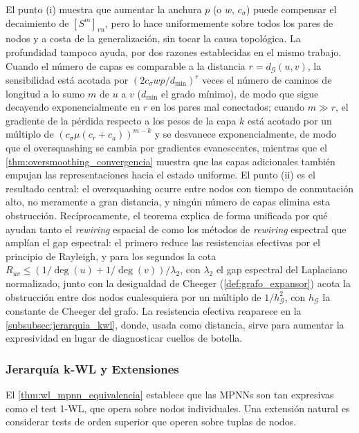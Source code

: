 El punto (i) muestra que aumentar la anchura $p$ (o $w$, $c_\sigma$) puede compensar el decaimiento de $[S^m]_{vu}$, pero lo hace uniformemente sobre todos los pares de nodos y a costa de la generalización, sin tocar la causa topológica. La profundidad tampoco ayuda, por dos razones establecidas en el mismo trabajo. Cuando el número de capas es comparable a la distancia $r = d_{\mathcal{G}}(u,v)$, la sensibilidad está acotada por $(2 c_\sigma w p / d_{\min})^{r}$ veces el número de caminos de longitud a lo sumo $m$ de $u$ a $v$ ($d_{\min}$ el grado mínimo), de modo que sigue decayendo exponencialmente en $r$ en los pares mal conectados; cuando $m \gg r$, el gradiente de la pérdida respecto a los pesos de la capa $k$ está acotado por un múltiplo de $(c_\sigma \mu (c_r + c_a))^{m-k}$ y se desvanece exponencialmente, de modo que el \gls{oversquashing} se cambia por gradientes evanescentes, mientras que el \autoref{thm:oversmoothing_convergencia} muestra que las capas adicionales también empujan las representaciones hacia el estado uniforme. El punto (ii) es el resultado central: el \gls{oversquashing} ocurre entre nodos con tiempo de conmutación alto, no meramente a gran distancia, y ningún número de capas elimina esta obstrucción. Recíprocamente, el teorema explica de forma unificada por qué ayudan tanto el \textit{rewiring} espacial de \citet{topping2022understanding} como los métodos de \textit{rewiring} espectral que amplían el gap espectral: el primero reduce las resistencias efectivas por el principio de Rayleigh, y para los segundos la cota $R_{uv} \leq (1/\deg(u) + 1/\deg(v))/\lambda_2$, con $\lambda_2$ el gap espectral del Laplaciano normalizado, junto con la desigualdad de Cheeger (\autoref{def:grafo_expansor}) acota la obstrucción entre dos nodos cualesquiera por un múltiplo de $1/h_{\mathcal{G}}^2$, con $h_{\mathcal{G}}$ la constante de Cheeger del grafo. La resistencia efectiva reaparece en la \autoref{subsubsec:jerarquia_kwl}, donde, usada como distancia, sirve para aumentar la expresividad en lugar de diagnosticar cuellos de botella.

\subsubsection{Jerarquía k-WL y Extensiones}\label{subsubsec:jerarquia_kwl}

El \autoref{thm:wl_mpnn_equivalencia} establece que las \glspl{MPNN} son tan expresivas como el test 1-WL, que opera sobre nodos individuales. Una extensión natural es considerar tests de orden superior que operen sobre tuplas de nodos.

